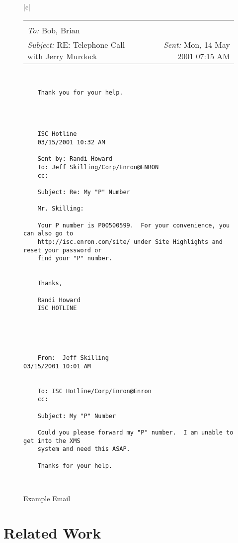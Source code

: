 \documentclass{llncs}
\begin{document}
\begin{figure}
\caption{Example Email}
\label{fig:examplemail}
\centering
\begin{tabular}{|c|}
	\hline 
	\begin{tabular}{lr}
		\makecell{
			\textit{From:} Alice\\ 
			\textit{To:} Bob, Brian\\
			\textit{Subject:} RE: Telephone Call with Jerry Murdock} &
		\textit{Sent:} Mon, 14 May 2001 07:15 AM
	\end{tabular}
	\\ 
	\hline 
	\begin{lstlisting}
	Thank you for your help.
	
	
	
	
	ISC Hotline
	03/15/2001 10:32 AM
	
	Sent by: Randi Howard
	To: Jeff Skilling/Corp/Enron@ENRON
	cc:  
	
	Subject: Re: My "P" Number  
	
	Mr. Skilling:
	
	Your P number is P00500599.  For your convenience, you can also go to 
	http://isc.enron.com/site/ under Site Highlights and reset your password or 
	find your "P" number.
	
	
	Thanks,
	
	Randi Howard
	ISC HOTLINE
	
	
	
	
	
	From:  Jeff Skilling                           03/15/2001 10:01 AM
	
	
	To: ISC Hotline/Corp/Enron@Enron
	cc:  
	
	Subject: My "P" Number
	
	Could you please forward my "P" number.  I am unable to get into the XMS 
	system and need this ASAP.
	
	Thanks for your help.
	\end{lstlisting}
	\\ 
	\hline 
\end{tabular} 
\end{figure}





\section{Related Work}
\end{document}
